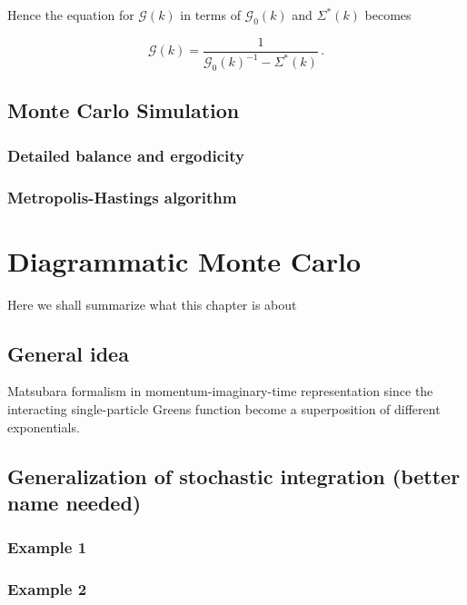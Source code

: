 \documentclass[12pt]{report}
\newcommand{\Gt}{\mathcal{G}}
\newcommand{\todo}[1]{{\leavevmode\color{todo}#1}}
\begin{document}
Hence the equation for $ \Gt(k) $ in terms of $ \Gt_0(k) $ and $ \Sigma^*(k) $ becomes

\begin{equation}
	\Gt(k) = \frac{1}{\Gt_0(k)^{-1} - \Sigma^*(k)} \,.
\end{equation}







\section{Monte Carlo Simulation}

\subsection{Detailed balance and ergodicity}

\subsection{Metropolis-Hastings algorithm}



\chapter{Diagrammatic Monte Carlo}

\todo{Here we shall summarize what this chapter is about}

\section{General idea}

\todo{Matsubara formalism in momentum-imaginary-time representation since the interacting single-particle Greens function become a superposition of different exponentials.}

\section{Generalization of stochastic integration (better name needed)}

\subsection{Example 1}
\subsection{Example 2}
\end{document}

